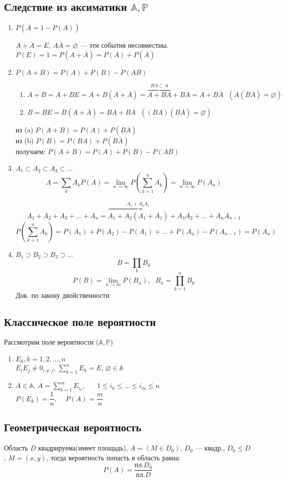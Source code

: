 \subsection{Следствие из аксиматики $\mathbb{A, P}$}
\begin{enumerate}
	\item $P(\overline{A} = 1 - P(A))$
		\begin{Proof}
			$A + \overline{A} = E$, $A\overline{A} = \varnothing$ --- эти события несовместны. $P(E) = 1 = P(A + \overline{A}) = P(A) + P(\overline{A})$
		\end{Proof}	
	\item $P(A + B) = P(A) + P(B) - P(AB)$
		\begin{Proof}
			\begin{enumerate}
				\item $A + B = A + BE = A + B(A + \overline{A}) = \overbrace{A + BA}^{BA \subset A} + B\overline{A} = A + B\overline{A}\ \ \ \left(A(B\overline{A}) = \varnothing \right)$
				\item $B = BE = B(A + \overline{A}) = BA + B\overline{A}\ \ \ \left( (BA)(B\overline{A}) = \varnothing  \right)$
			\end{enumerate}
			из (a) $P(A + B) = P(A) + P(B\overline{A})$\\
			из (b) $P(B) = P(BA) + P(B\overline{A})$ \\
			получаем: $P(A + B) = P(A) + P(B) - P(AB)$
		\end{Proof}
	\item $A_1 \subset A_2 \subset A_3 \subset \ldots$
	\[
		A = \sum_k A_k
		P(A) = \lim_{n \to \infty} P \left( \sum_{k = 1}^{n} A_k \right) = \lim_{n \to \infty} P(A_n)	
	\]
	\begin{Proof}
		\[
		A_1 + A_2 + A_3 +\ldots + A_n = \overbrace{A_1 + A_2(A_1 + \overline{A_1})}^{A_1 + A_2\overline{A_1}} + A_3\overline{A_2} + \ldots + A_nA_{n-1}
		\] \[
		P \left( \sum_{k = 1}^n A_k \right) = P(A_1) + P(A_2) - P(A_1) + \ldots + P(A_n) - P(A_{n - 1}) = P(A_n)		
		\]
	\end{Proof}
	
	\item $B_1 \supset B_2 \supset B_3 \supset \ldots$ 
	\[
		B = \prod_k B_k	
	\] \[
		P(B)	 = \lim_{n \to \infty} P(B_n), \ \ \ B_n = \prod_{k = 1}^n B_k
	\]
	Док. по закону двойственности
\end{enumerate}
\subsection{Классическое поле вероятности}
Рассмотрим поле вероятности ($\mathbb{A, P}$)
\begin{enumerate}
	\item $E_k, k = 1, 2, \ldots, n$ \\
		  $E_i E_j \not= 0_{i \not= j}$, $\sum_{k = 1}^n E_k = E$, $\varnothing \in \mathbb{A}$
	\item $A \in \mathbb{A}$, $A = \sum_{k = 1}^m E_{i_k}$, \ \ \ $1 \le i_k \le \ldots \le i_m \le n$\\
	$P(E_k) = \dfrac{1}{n}$, \ \ $P(A) = \dfrac{m}{n}$
\end{enumerate}


\subsection{Геометрическая вероятность}
Область $D$ квадрируема(имеет площадь), $A = (M \in D_0)$, $D_0$ --- квадр., $D_0 \le D$,  $M = (x,y)$, тогда вероятность попасть в область равна: 
\[
	P(A) = \dfrac{\text{пл.} D_0}{\text{пл.} D}
\]
